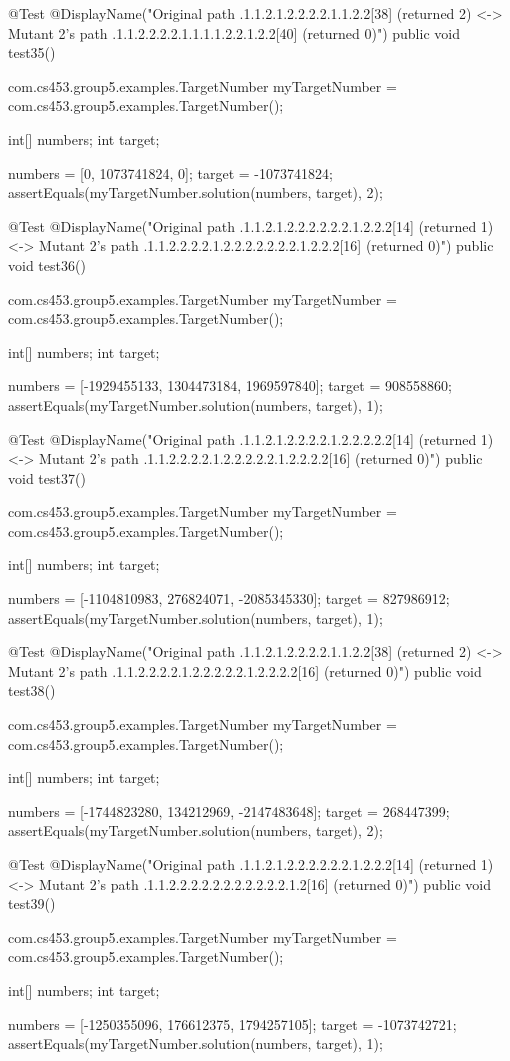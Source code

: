 @Test
@DisplayName("Original path .1.1.2.1.2.2.2.2.1.1.2.2[38] (returned 2) <-> Mutant 2's path .1.1.2.2.2.2.1.1.1.1.2.2.1.2.2[40] (returned 0)")
public void test35() {
    com.cs453.group5.examples.TargetNumber myTargetNumber = com.cs453.group5.examples.TargetNumber();

    int[] numbers;
    int target;

    numbers = [0, 1073741824, 0];
    target = -1073741824;
    assertEquals(myTargetNumber.solution(numbers, target), 2);
}

@Test
@DisplayName("Original path .1.1.2.1.2.2.2.2.2.2.1.2.2.2[14] (returned 1) <-> Mutant 2's path .1.1.2.2.2.2.1.2.2.2.2.2.2.2.1.2.2.2[16] (returned 0)")
public void test36() {
    com.cs453.group5.examples.TargetNumber myTargetNumber = com.cs453.group5.examples.TargetNumber();

    int[] numbers;
    int target;

    numbers = [-1929455133, 1304473184, 1969597840];
    target = 908558860;
    assertEquals(myTargetNumber.solution(numbers, target), 1);
}

@Test
@DisplayName("Original path .1.1.2.1.2.2.2.2.1.2.2.2.2.2[14] (returned 1) <-> Mutant 2's path .1.1.2.2.2.2.1.2.2.2.2.2.1.2.2.2.2[16] (returned 0)")
public void test37() {
    com.cs453.group5.examples.TargetNumber myTargetNumber = com.cs453.group5.examples.TargetNumber();

    int[] numbers;
    int target;

    numbers = [-1104810983, 276824071, -2085345330];
    target = 827986912;
    assertEquals(myTargetNumber.solution(numbers, target), 1);
}

@Test
@DisplayName("Original path .1.1.2.1.2.2.2.2.1.1.2.2[38] (returned 2) <-> Mutant 2's path .1.1.2.2.2.2.1.2.2.2.2.2.1.2.2.2.2[16] (returned 0)")
public void test38() {
    com.cs453.group5.examples.TargetNumber myTargetNumber = com.cs453.group5.examples.TargetNumber();

    int[] numbers;
    int target;

    numbers = [-1744823280, 134212969, -2147483648];
    target = 268447399;
    assertEquals(myTargetNumber.solution(numbers, target), 2);
}

@Test
@DisplayName("Original path .1.1.2.1.2.2.2.2.2.2.1.2.2.2[14] (returned 1) <-> Mutant 2's path .1.1.2.2.2.2.2.2.2.2.2.2.2.1.2[16] (returned 0)")
public void test39() {
    com.cs453.group5.examples.TargetNumber myTargetNumber = com.cs453.group5.examples.TargetNumber();

    int[] numbers;
    int target;

    numbers = [-1250355096, 176612375, 1794257105];
    target = -1073742721;
    assertEquals(myTargetNumber.solution(numbers, target), 1);
}

